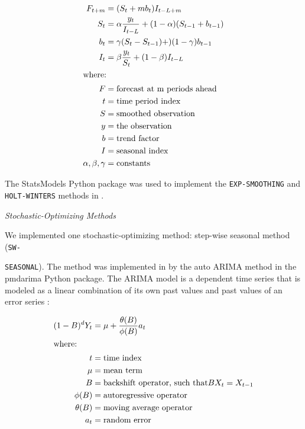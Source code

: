 \begin{align}
    F_{t+m} &= (S_t +mb_t)I_{t-L+m} \\
    S_t &= \alpha \frac{y_t}{I_{t-L}}+(1-\alpha)(S_{t-1}+b_{t-1}) \nonumber \\
    b_t &= \gamma(S_t-S_{t-1})+)(1-\gamma)b_{t-1} \nonumber \\
    I_t &= \beta \frac{y_t}{S_t} + (1-\beta)I_{t-L} \nonumber \\
    \intertext{where:}
    F &= \mbox{forecast at m periods ahead} \nonumber \\
    t &= \mbox{time period index} \nonumber \\
    S &= \mbox{smoothed observation} \nonumber \\
    y &= \mbox{the observation} \nonumber \\
    b &= \mbox{trend factor} \nonumber \\
    I &= \mbox{seasonal index} \nonumber \\
    \alpha, \beta, \gamma &= \mbox{constants} \nonumber
\end{align}

The StatsModels \cite{github_community_statsmodels:_2019}
Python package was used to implement the \texttt{EXP-SMOOTHING} 
and \texttt{HOLT-WINTERS} methods in \deploy. 

\noindent
\textit{Stochastic-Optimizing Methods}

We implemented one stochastic-optimizing method: step-wise 
seasonal method (\texttt{SW-}

\noindent
\texttt{SEASONAL}). 
The method was implemented in \deploy by the auto \gls{ARIMA} 
method in the pmdarima \cite{noauthor_pmdarima:_2019}
Python package. 
The \gls{ARIMA} model is a dependent time series that is 
modeled as a linear combination of its own past values 
and past values of an error series \cite{institute_sas_1985}: 

\begin{align}
    (1-B)^dY_t &= \mu + \frac{\theta(B)}{\phi(B)}a_t \\ 
    \intertext{where:}
    t &= \mbox{time index} \nonumber \\
    \mu &= \mbox{mean term} \nonumber \\
    B &= \mbox{backshift operator, such that} BX_t = X_{t-1} \nonumber \\
    \phi(B) &= \mbox{autoregressive operator} \nonumber \\
    \theta(B) &= \mbox{moving average operator} \nonumber \\
    a_t &= \mbox{random error} \nonumber 
\end{align}

